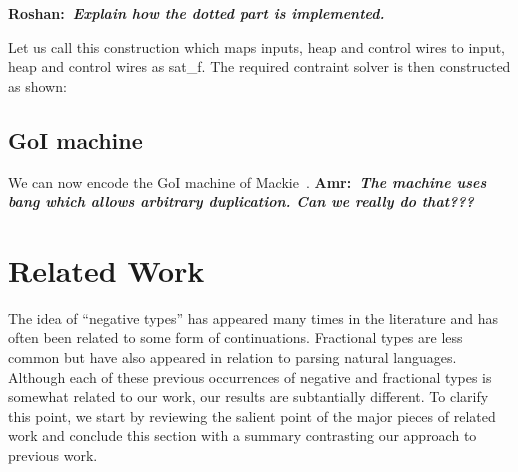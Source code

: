 \documentclass[preprint]{sigplanconf}
\newcommand{\xcomment}[2]{\textbf{#1:~\textsl{#2}}}
\newcommand{\amr}[1]{\xcomment{Amr}{#1}}
\newcommand{\roshan}[1]{\xcomment{Roshan}{#1}}
\begin{document}
{\begin{center}
\end{center}  

\roshan{Explain how the dotted part is implemented.}

Let us call this construction which maps inputs, heap and control
wires to input, heap and control wires as {{sat_f}}. The required
contraint solver is then constructed as shown:

\begin{center}
\end{center}  




\subsection{GoI machine}

We can now encode the GoI machine of
Mackie~\cite{Mackie2011,DBLP:conf/popl/Mackie95}. \amr{The machine uses bang
  which allows arbitrary duplication. Can we really do that???}

\section{Related Work} 
\label{sec:related}

The idea of ``negative types'' has appeared many times in the literature and
has often been related to some form of continuations. Fractional types are
less common but have also appeared in relation to parsing natural
languages. Although each of these previous occurrences of negative and
fractional types is somewhat related to our work, our results are
subtantially different. To clarify this point, we start by reviewing the
salient point of the major pieces of related work and conclude this section
with a summary contrasting our approach to previous work.

}
\end{document}
